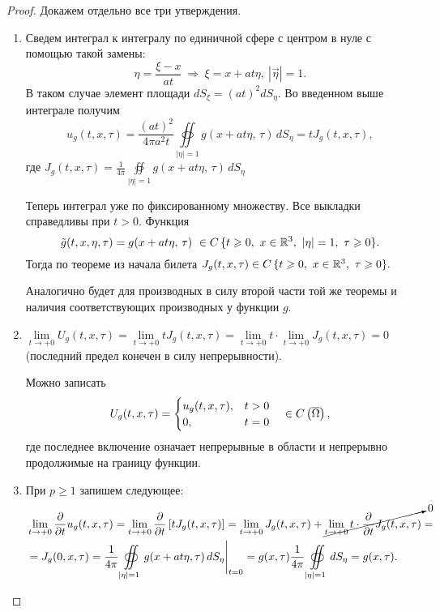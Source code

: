\documentclass[../main.tex]{subfiles}
\begin{document}
\begin{proof} Докажем отдельно все три утверждения.
%
\begin{enumerate}
\item Сведем интеграл к интегралу по единичной сфере с центром в нуле с помощью такой замены:
\[
\eta = \frac{\xi - x}{at}
\ \Rightarrow\ 
\xi = x+at\eta,\ |\vec{\eta}|=1.
\]
В таком случае элемент площади $dS_{\xi}=(at)^2dS_{\eta}$. Во введенном выше интеграле получим 
\[
u_g(t,x,\tau) = \frac{(at)^2}{4\pi a^2t}
\oiint\limits_{|\eta|=1}   g(x+at\eta,\,\tau)\,   dS_{\eta} 
= t J_g(t,x,\tau),
\]
где $\displaystyle J_g(t,x,\tau) = \frac{1}{4\pi}
\oiint\limits_{|\eta|=1}   g(x+at\eta,\,\tau)\,   dS_{\eta}$

Теперь интеграл уже по фиксированному множеству. Все выкладки справедливы при $t>0$. Функция
\[
\tilde{g}(t,x,\eta,\tau) = g(x+at\eta,\, \tau)\ 
\in C\, \{t \geq 0,\   x\in\R^3,\   |\eta| = 1,\   \tau \geq 0\}.
\]
Тогда по теореме из начала билета 
$J_g(t,x,\tau) \in C\, \{t\geqslant 0,\   x\in\mathbb{R}^3,\   \tau \geqslant 0\}.$

Аналогично будет для производных в силу второй части той же теоремы и наличия соответствующих производных у функции $g$.

\item $\lim\limits_{t\rightarrow +0} U_g(t,x,\tau)
     = \lim\limits_{t\rightarrow +0} t J_g(t,x,\tau)
     = \lim\limits_{t\rightarrow +0} t 
 \cdot \lim\limits_{t\rightarrow +0} J_g(t,x,\tau) = 0$ 
 (последний предел конечен в силу непрерывности).

Можно записать
\[
U_g(t,x,\tau) 
= \begin{cases}
    u_g(t,x, \tau), &t>0\\
    0, &t=0
  \end{cases} \quad 
\in C \left( \overline{\Omega} \right),
\]
где последнее включение означает непрерывные в области и непрерывно продолжимые на границу функции.

\item При $p\geq 1$ запишем следующее:
\begin{equation*}
\begin{split}
&\lim\limits_{t\rightarrow +0} \pd{}{t} u_g(t,x, \tau) 
=\lim\limits_{t\rightarrow +0} \pd{}{t} \squareBr{t J_g(t,x,\tau)}
=\lim\limits_{t\rightarrow +0} J_g(t,x,\tau)
+\cancelto{0}
{\lim\limits_{t\rightarrow +0} t \cdot \pd{}{t} J_g(t,x,\tau)} = \\
%
&= J_g(0, x, \tau) = \frac{1}{4\pi}
\oiint\limits_{|\eta|=1}   g(x+at\eta,\tau)\,   dS_{\eta }
\Biggr|_{t=0}
= g(x,\tau) \frac{1}{4\pi}
\oiint\limits_{|\eta|=1}   dS_{\eta}   =   g(x,\tau).
\end{split}
\end{equation*}
\end{enumerate}
\end{proof}
\end{document}
